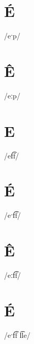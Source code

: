 \documentclass[10pt,a4paper,twoside]{book}
\begin{document}
\section*{É}

\begin{multicols}{3}
 {/eˑp/} {}
\end{multicols}

\section*{Ê}

\begin{multicols}{3}
 {/eːp/} {}
\end{multicols}

\section*{E}

\begin{multicols}{3}
 {/ef͡f/} {}
\end{multicols}

\section*{É}

\begin{multicols}{3}
 {/eˑf͡f/} {}
\end{multicols}

\section*{Ê}

\begin{multicols}{3}
 {/eːf͡f/} {}
\end{multicols}

\section*{É}

\begin{multicols}{3}
 {/eˑf͡f l͡le/} {}
\end{multicols}
\end{document}
